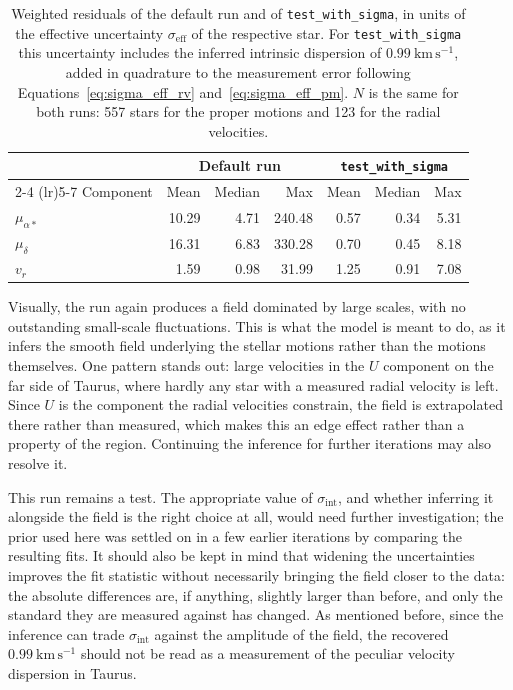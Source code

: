 \begin{table}[h!]
    \centering
    \caption{Weighted residuals of the default run and of \texttt{test\_with\_sigma}, in units of the
    effective uncertainty $\sigma_\mathrm{eff}$ of the respective star. For \texttt{test\_with\_sigma}
    this uncertainty includes the inferred intrinsic dispersion of $0.99~\mathrm{km\,s^{-1}}$, added in
    quadrature to the measurement error following Equations~\ref{eq:sigma_eff_rv}
    and~\ref{eq:sigma_eff_pm}. $N$ is the same for both runs: 557 stars for the proper motions and 123
    for the radial velocities.}
    \label{tab:residuals_sigma}
    \begin{tabular}{l r r r r r r}
        \toprule
                        & \multicolumn{3}{c}{Default run} & \multicolumn{3}{c}{\texttt{test\_with\_sigma}}                                 \\
        \cmidrule(lr){2-4} \cmidrule(lr){5-7}
        Component       & Mean                            & Median                                         & Max    & Mean & Median & Max  \\
        \midrule
        $\mu_{\alpha*}$ & 10.29                           & 4.71                                           & 240.48 & 0.57 & 0.34   & 5.31 \\
        $\mu_{\delta}$  & 16.31                           & 6.83                                           & 330.28 & 0.70 & 0.45   & 8.18 \\
        $v_r$           & 1.59                            & 0.98                                           & 31.99  & 1.25 & 0.91   & 7.08 \\
        \bottomrule
    \end{tabular}
\end{table}

Visually, the run again produces a field dominated by large scales, with no outstanding small-scale
fluctuations. This is what the model is meant to do, as it infers the smooth field underlying the stellar
motions rather than the motions themselves. One pattern stands out: large velocities in the $U$ component
on the far side of Taurus, where hardly any star with a measured radial velocity is left. Since $U$ is the
component the radial velocities constrain, the field is extrapolated there rather than measured, which
makes this an edge effect rather than a property of the region. Continuing the inference for further
iterations may also resolve it.

This run remains a test. The appropriate value of $\sigma_\mathrm{int}$, and whether inferring it alongside
the field is the right choice at all, would need further investigation; the prior used here was settled on
in a few earlier iterations by comparing the resulting fits. It should also be kept in mind that widening
the uncertainties improves the fit statistic without necessarily bringing the field closer to the data: the absolute
differences are, if anything, slightly larger than before, and only the standard they are measured against
has changed. As mentioned before, since the inference can
trade $\sigma_\mathrm{int}$ against the amplitude of the field, the recovered
$0.99~\mathrm{km\,s^{-1}}$ should not be read as a measurement of the peculiar velocity dispersion
in Taurus.


